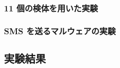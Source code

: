 \subsubsection{11 個の検体を用いた実験}
\label{exp1}


\subsubsection{SMS  を送るマルウェアの実験}
\label{exp2}

\subsection{実験結果}
